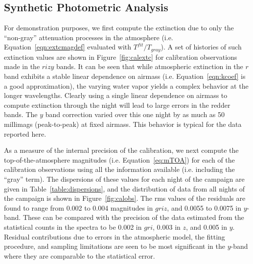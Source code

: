 \documentclass[manuscript]{aastex}
\begin{document}
\subsection{Synthetic Photometric Analysis}

For demonstration purposes, we first compute the extinction due to only the ``non-gray'' attenuation processes in the atmosphere 
(i.e. Equation~\ref{eqn:extcmagdef} evaluated with $T^{fit}/T_{gray}$).
A set of histories of such extinction values are shown in Figure~\ref{fig:calextc} for
calibration observations made in the $rizy$ bands.
It can be seen that while atmospheric extinction in the $r$ band exhibits a stable linear dependence on airmass
(i.e. Equation~\ref{eqn:kcoef} is a good approximation),
the varying water vapor yields a complex behavior at the longer wavelengths.
Clearly using a single linear dependence on airmass to compute extinction through the night will lead to large errors in the redder bands.
The $y$ band correction varied over this one night by as much as 50 millimags (peak-to-peak) at fixed airmass.
This behavior is typical for the data reported here.

As a measure of the internal precision of the calibration, we next compute the top-of-the-atmosphere magnitudes
(i.e. Equation~\ref{eq:mTOA}) for each of
the calibration observations using all the information available (i.e. including the ``gray'' term).
The dispersions of these values for each night of the campaign are given in Table~\ref{table:dispersions}, 
and the distribution of data from all nights of the campaign is shown in Figure~\ref{fig:calobs}.
The rms values of the residuals are found to range from 0.002 to 0.004 magnitudes in $griz$, and 0.0055 to 0.0075 in $y$-band.
These can be compared with the precision of the data estimated from the statistical counts in the spectra
to be 0.002 in $gri$, 0.003 in $z$, and 0.005 in $y$.
Residual contributions due to errors in the atmospheric model, the fitting procedure, and sampling limitations are seen to 
be most significant in the $y$-band where they are comparable to the statistical error. 
\end{document}
